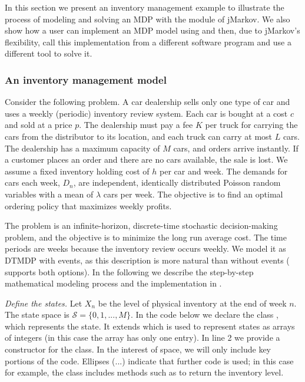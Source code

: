 In this section we present an inventory management example to illustrate the
process of modeling and solving an MDP with the  module of
jMarkov. We also show how a user can implement an MDP model using \jMDP and
then, due to jMarkov's flexibility, call this implementation from a different
software program and use a different tool to solve it.

\subsubsection{An inventory management model}
\label{sec:mdp_example}
Consider the following problem. A car dealership sells only one type of car and uses a
weekly (periodic) inventory review system. Each car is bought at a cost $c$ and
sold at a price $p$. The dealership must pay a fee $K$ per truck for carrying
the cars from the distributor to its location, and each truck can carry at most
$L$ cars. The dealership has a maximum capacity of $M$ cars, and orders arrive
instantly. If a customer places an order and there are no cars available, the
sale is lost. We assume a fixed inventory holding cost of $h$ per car and week.
The demands for cars each week, $D_n$, are independent, identically distributed
Poisson random variables with a mean of $\lambda$ cars per week. The objective
is to find an optimal ordering policy that maximizes weekly profits.

The problem is an infinite-horizon, discrete-time stochastic decision-making
problem, and the objective is to minimize the long run average cost. The time
periods are weeks because the inventory review occurs weekly. We model it as
DTMDP with events, as this description is more natural than without events
( supports both options). In the following we describe the
step-by-step mathematical modeling process and the implementation in
.


\emph{Define the states.} Let  $X_n$ be the level of physical inventory at the
end of week $n$. The state space is $\mathcal{S}=\{0,1,...,M\}$. In the code
below we declare the class , which represents the state. It
extends  which is used to represent states as arrays of
integers (in this case the array has only one entry).  In line 2 we provide a
constructor for the class. In the interest of space, we will only include key
portions of the code. Ellipses (...) indicate that further code is used; in
this case for example, the class includes methods such as  to
return the inventory level.


